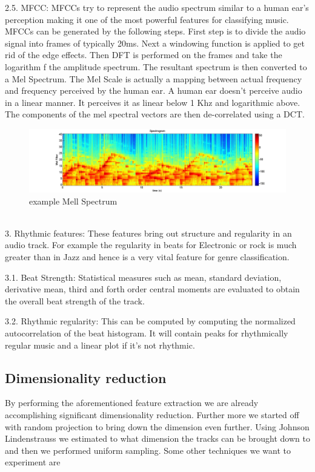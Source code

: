 \documentclass[10pt,a4paper]{article}
\begin{document}
	2.5.	MFCC:  MFCCs try to represent the audio spectrum similar to a human ear's perception making it one of the most powerful features for classifying music. MFCCs can be generated by the following steps. First step is to divide the audio signal into frames of typically 20ms. Next a windowing function is applied to get rid of the edge effects. Then DFT is performed on the frames and take the logarithm f the amplitude spectrum. The resultant spectrum is then converted to a Mel Spectrum.  The Mel Scale is actually a mapping between actual frequency and frequency perceived by the human ear. A human ear doesn't perceive audio in a linear manner. It perceives it as linear below 1 Khz and logarithmic above. The components of the mel spectral vectors are then de-correlated using a DCT.\\
	\newline
	\begin{figure}[h]
		\includegraphics[width = \linewidth]{204_classical}
		\caption{example Mell Spectrum}
	\end{figure}\\
	3.	Rhythmic features: These features bring out structure and regularity  in an audio track. For example the regularity in beats for Electronic or rock is much greater than in Jazz and hence is a very vital feature for genre classification.
	
	3.1.	Beat Strength:  Statistical measures such as mean, standard deviation, derivative mean, third and forth order central moments are evaluated to obtain the overall beat strength of the track.
	
	3.2.	Rhythmic regularity: This can be computed by computing the normalized autocorrelation of the beat histogram. It will contain peaks for rhythmically regular music and a linear plot if it's not rhythmic.
	
	
	\subsection{Dimensionality reduction}
	By performing the aforementioned feature extraction we are already accomplishing significant dimensionality reduction. Further more we started off with random projection to bring down the dimension even further. Using Johnson Lindenstrauss we estimated to what dimension the tracks can be brought down to and then we performed uniform sampling. Some other techniques we want to experiment are
	
\end{document}
